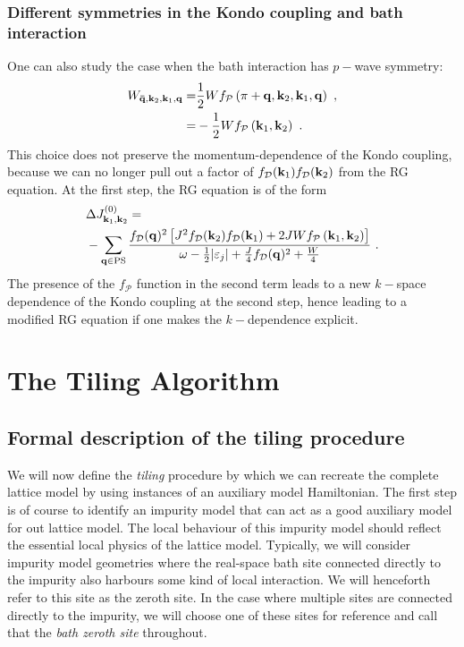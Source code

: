 \documentclass[reprint,hidelinks]{revtex4-2}
\begin{document}
\subsubsection{Different symmetries in the Kondo coupling and bath interaction}
One can also study the case when the bath interaction has \(p-\)wave symmetry:
\begin{equation}\begin{aligned}
	W_{{\bf \bar q}, {\bf k}_2, {\bf k}_1, {\bf q}} =& \frac{1}{2}W f_\mathcal{P}\left(\pi + {\bf q}, {\bf k}_2, {\bf k}_1, {\bf q}\right) ~,\\
	=& -\frac{1}{2}Wf_\mathcal{P}\left({\bf k}_1, {\bf k}_2\right)~.
\end{aligned}\end{equation}
This choice does not preserve the momentum-dependence of the Kondo coupling, because we can no longer pull out a factor of \(f_\mathcal{D}({\bf k}_1)f_\mathcal{D}({\bf k}_2)\) from the RG equation. At the first step, the RG equation is of the form
\begin{equation}\begin{aligned}
	&\Delta J^{(0)}_{{\bf k}_1, {\bf k}_2} =\\
	&-\sum_{{\bf q} \in \text{PS}} \frac{f_\mathcal{D}({\bf q})^2\left[{J}^2 f_\mathcal{D}({\bf k}_2)f_\mathcal{D}({\bf k}_1) + 2JW f_\mathcal{P}\left({\bf k}_1, {\bf k}_2\right)\right] }{\omega - \frac{1}{2}|\varepsilon_j| + \frac{J}{4}f_\mathcal{D}({\bf q})^2 + \frac{W}{4}}~.
\end{aligned}\end{equation}
The presence of the \(f_\mathcal{P}\) function in the second term leads to a new \(k-\)space dependence of the Kondo coupling at the second step, hence leading to a modified RG equation if one makes the \(k-\)dependence explicit.

\section{The Tiling Algorithm}

\subsection{Formal description of the tiling procedure}\label{formalDescription}
We will now define the {\it tiling} procedure by which we can recreate the complete lattice model by using instances of an auxiliary model Hamiltonian. The first step is of course to identify an impurity model that can act as a good auxiliary model for out lattice model. The local behaviour of this impurity model should reflect the essential local physics of the lattice model. Typically, we will consider impurity model geometries where the real-space bath site connected directly to the impurity also harbours some kind of local interaction. We will henceforth refer to this site as the zeroth site. In the case where multiple sites are connected directly to the impurity, we will choose one of these sites for reference and call that the {\it bath zeroth site} throughout.
\end{document}
